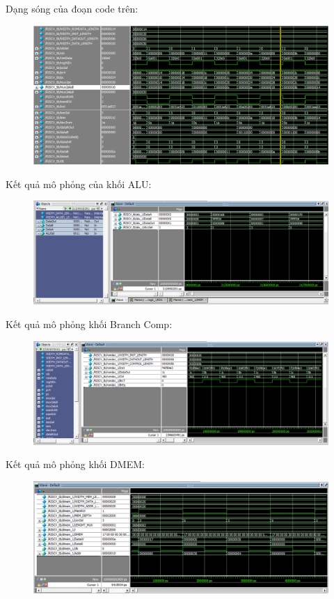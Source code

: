 \documentclass[E:/Latex/ExtraWork/ComputerArchitechture/Report.tex]{subfiles}
\begin{document}
\begin{otherlanguage}{english}
				Dạng sóng của đoạn code trên:
					\begin{figure}[h!]
						\includegraphics[scale = 0.6]{Figure/Fig6.png}
						\centering
					\end{figure}

				\newpage
				Kết quả mô phỏng của khối ALU:
					\begin{figure}[h!]
						\includegraphics[scale = 0.6]{Figure/Fig4.png}
						\centering
					\end{figure}
				
				Kết quả mô phỏng khối Branch Comp:
					\begin{figure}[h!]
						\includegraphics[scale = 0.6]{Figure/Fig5.png}
						\centering
					\end{figure}

				Kết quả mô phỏng khối DMEM:
					\begin{figure}[h!]
						\includegraphics[scale = 0.6]{Figure/Fig7.png}
						\centering
					\end{figure}


\end{otherlanguage}
\end{document}

